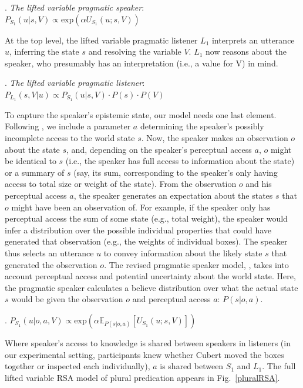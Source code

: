 \documentclass[linguex]{sp}
\begin{document}
\ex. \emph{The lifted variable pragmatic speaker}:\\
$P_{S_{1}}(u|s,V) \propto \textrm{exp}(\alpha U_{S_{1}}\!(u;s,V))$

At the top level, the lifted variable pragmatic listener $L_{1}$ interprets an utterance $u$, inferring the state $s$ and resolving the variable $V$. $L_{1}$ now reasons about the speaker, who presumably has an interpretation (i.e., a value for V) in mind.

\ex. \emph{The lifted variable pragmatic listener}:\\
$P_{L_{1}}(s,V|u) \propto P_{S_{1}}(u|s,V) \cdot P(s) \cdot P(V)$

To capture the speaker's epistemic state, our model needs one last element. Following \cite{goodmanstuhlmuller2013}, we include a parameter $a$ determining the speaker's possibly incomplete access to the world state $s$. Now, the speaker makes an observation $o$ about the state $s$, and, depending on the speaker's perceptual access $a$, $o$ might be identical to $s$ (i.e., the speaker has full access to information about the state) or a summary of $s$ (say, its sum, corresponding to the speaker's only having access to total size or weight of the state). From the observation $o$ and his perceptual access $a$, the speaker generates an expectation about the states $s$ that $o$ might have been an observation of. For example, if the speaker only has perceptual access the sum of some state (e.g., total weight), the speaker would infer a distribution over the possible individual properties that could have generated that observation (e.g., the weights of individual boxes). The speaker thus selects an utterance $u$ to convey information about the likely state $s$ that generated the observation $o$. The revised  pragmatic speaker model, \Next, takes into account perceptual access and potential uncertainty about the world state. Here, the pragmatic speaker calculates a believe distribution over what the actual state $s$ would be given the observation $o$ and perceptual access $a$: $P(s|o,a)$.

\ex. $P_{S_{1}} (u|o,a,V) \propto \textrm{exp}(\alpha \mathbb{E}_{P(s|o,a)}[U_{S_{1}} (u;s,V)])$

Where speaker's access to knowledge is shared between speakers in listeners (in our experimental setting, participants knew whether Cubert moved the boxes together or inspected each individually), $a$ is shared between $S_{1}$ and $L_{1}$. The full lifted variable RSA model of plural predication appears in Fig.~\ref{pluralRSA}.
\end{document}
